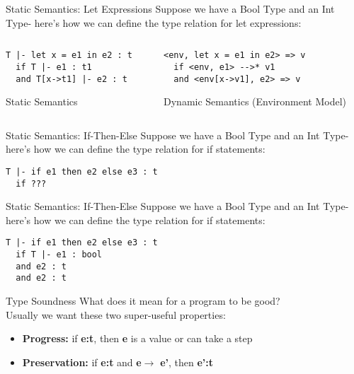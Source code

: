 \documentclass{beamer}
\begin{document}
    \begin{frame}[fragile]{Static Semantics: Let Expressions}
    Suppose we have a Bool Type and an Int Type- here's how we can define the type relation for let expressions:
    \begin{columns}
        \begin{column}{0.48\textwidth}
\begin{verbatim}
T |- let x = e1 in e2 : t
  if T |- e1 : t1
  and T[x->t1] |- e2 : t
\end{verbatim}
    Static Semantics
        \end{column}
        \begin{column}{0.48\textwidth}
\begin{verbatim}
<env, let x = e1 in e2> => v
  if <env, e1> -->* v1
  and <env[x->v1], e2> => v
\end{verbatim}
    Dynamic Semantics (Environment Model)
        \end{column}
    \end{columns}
    \end{frame}
    
    \begin{frame}[fragile]{Static Semantics: If-Then-Else}
    Suppose we have a Bool Type and an Int Type- here's how we can define the type relation for if statements:
\begin{verbatim}
T |- if e1 then e2 else e3 : t
  if ???
\end{verbatim}
    \end{frame}
    
    \begin{frame}[fragile]{Static Semantics: If-Then-Else}
    Suppose we have a Bool Type and an Int Type- here's how we can define the type relation for if statements:
\begin{verbatim}
T |- if e1 then e2 else e3 : t
  if T |- e1 : bool
  and e2 : t
  and e2 : t
\end{verbatim}
    \end{frame}
    
    \begin{frame}{Type Soundness}
        What does it mean for a program to be good? \pause \\
        
        Usually we want these two super-useful properties:
        \begin{itemize}
            \item \textbf{Progress:} if \textbf{e:t}, then \textbf{e} is a value or can take a step
            \item \textbf{Preservation:} if \textbf{e:t} and \textbf{e}$\to$ \textbf{e'}, then \textbf{e':t}
        \end{itemize}
    \end{frame}
    
\end{document}
